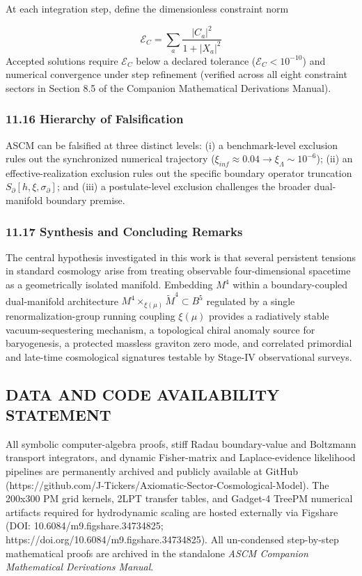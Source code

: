\documentclass[aps,prd,onecolumn,superscriptaddress,nofootinbib,longbibliography,10pt]{revtex4-2}
\begin{document}
  At each integration step, define the dimensionless constraint norm


  \[ \mathcal{E}_C = \sum_a \frac{|C_a|^2}{1 + |X_a|^2} \]
  Accepted solutions require \(\mathcal{E}_C\) below a declared tolerance (\(\mathcal{E}_C < 10^{-10}\)) and numerical convergence under step refinement (verified across all eight constraint sectors in Section 8.5 of the Companion Mathematical Derivations Manual).



  
\subsubsection*{11.16 Hierarchy of Falsification}

  ASCM can be falsified at three distinct levels: (i) a benchmark-level exclusion rules out the synchronized numerical trajectory (\(\xi_{inf} \approx 0.04 \to \xi_\Lambda \sim 10^{-6}\)); (ii) an effective-realization exclusion rules out the specific boundary operator truncation \(S_\partial[h,\xi,\sigma_\partial]\); and (iii) a postulate-level exclusion challenges the broader dual-manifold boundary premise.



  
\subsubsection*{11.17 Synthesis and Concluding Remarks}

  The central hypothesis investigated in this work is that several persistent tensions in standard cosmology arise from treating observable four-dimensional spacetime as a geometrically isolated manifold. Embedding \(M^4\) within a boundary-coupled dual-manifold architecture \(M^4 \times_{\xi(\mu)} \tilde{M}^4 \subset B^5\) regulated by a single renormalization-group running coupling \(\xi(\mu)\) provides a radiatively stable vacuum-sequestering mechanism, a topological chiral anomaly source for baryogenesis, a protected massless graviton zero mode, and correlated primordial and late-time cosmological signatures testable by Stage-IV observational surveys.


  
  
\subsection*{DATA AND CODE AVAILABILITY STATEMENT}

  All symbolic computer-algebra proofs, stiff Radau boundary-value and Boltzmann transport integrators, and dynamic Fisher-matrix and Laplace-evidence likelihood pipelines are permanently archived and publicly available at GitHub (https://github.com/J-Tickers/Axiomatic-Sector-Cosmological-Model). The 200x300 PM grid kernels, 2LPT transfer tables, and Gadget-4 TreePM numerical artifacts required for hydrodynamic scaling are hosted externally via Figshare (DOI: 10.6084/m9.figshare.34734825; https://doi.org/10.6084/m9.figshare.34734825). All un-condensed step-by-step mathematical proofs are archived in the standalone \textit{ASCM Companion Mathematical Derivations Manual}.
\end{document}
